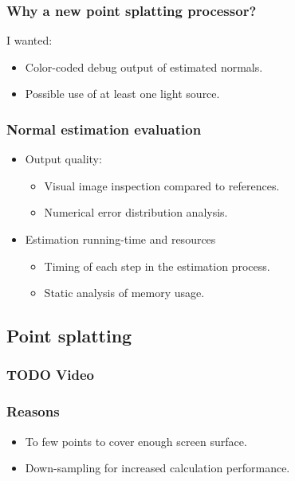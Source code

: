 \documentclass[11pt]{article}
\begin{document}
\subsubsection*{Why a new point splatting processor?}
\label{sec:orge61c2bb}
I wanted:
\begin{itemize}
\item Color-coded debug output of estimated normals.
\item Possible use of at least one light source.
\end{itemize}

\subsubsection*{Normal estimation evaluation}
\label{sec:orga795a9a}
\begin{itemize}
\item Output quality:
\begin{itemize}
\item Visual image inspection compared to references.
\item Numerical error distribution analysis.
\end{itemize}
\item Estimation running-time and resources
\begin{itemize}
\item Timing of each step in the estimation process.
\item Static analysis of memory usage.
\end{itemize}
\end{itemize}

\subsection*{Point splatting}
\label{sec:org059b169}
\subsubsection*{{\bfseries\sffamily TODO} Video}
\label{sec:orgf3e9d3b}
\subsubsection*{Reasons}
\label{sec:org5dca0a7}
\begin{itemize}
\item To few points to cover enough screen surface.
\item Down-sampling for increased calculation performance.
\end{itemize}
\end{document}
